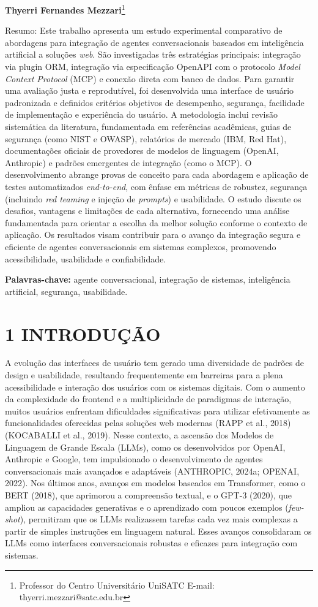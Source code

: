 \documentclass[
]{article}
\begin{document}
\textbf{Thyerri Fernandes Mezzari}\footnote{Professor do Centro
  Universitário UniSATC E-mail: thyerri.mezzari@satc.edu.br}

Resumo: Este trabalho apresenta um estudo experimental comparativo de
abordagens para integração de agentes conversacionais baseados em
inteligência artificial a soluções \emph{web}. São investigadas três
estratégias principais: integração via plugin ORM, integração via
especificação OpenAPI com o protocolo \emph{Model Context Protocol}
(MCP) e conexão direta com banco de dados. Para garantir uma avaliação
justa e reprodutível, foi desenvolvida uma interface de usuário
padronizada e definidos critérios objetivos de desempenho, segurança,
facilidade de implementação e experiência do usuário. A metodologia
inclui revisão sistemática da literatura, fundamentada em referências
acadêmicas, guias de segurança (como NIST e OWASP), relatórios de
mercado (IBM, Red Hat), documentações oficiais de provedores de modelos
de linguagem (OpenAI, Anthropic) e padrões emergentes de integração
(como o MCP). O desenvolvimento abrange provas de conceito para cada
abordagem e aplicação de testes automatizados \emph{end-to-end}, com
ênfase em métricas de robustez, segurança (incluindo \emph{red teaming}
e injeção de \emph{prompts}) e usabilidade. O estudo discute os
desafios, vantagens e limitações de cada alternativa, fornecendo uma
análise fundamentada para orientar a escolha da melhor solução conforme
o contexto de aplicação. Os resultados visam contribuir para o avanço da
integração segura e eficiente de agentes conversacionais em sistemas
complexos, promovendo acessibilidade, usabilidade e confiabilidade.

\textbf{Palavras-chave:} agente conversacional, integração de sistemas,
inteligência artificial, segurança, usabilidade.

\section{1 INTRODUÇÃO}\label{introduuxe7uxe3o}

A evolução das interfaces de usuário tem gerado uma diversidade de
padrões de design e usabilidade, resultando frequentemente em barreiras
para a plena acessibilidade e interação dos usuários com os sistemas
digitais. Com o aumento da complexidade do frontend e a multiplicidade
de paradigmas de interação, muitos usuários enfrentam dificuldades
significativas para utilizar efetivamente as funcionalidades oferecidas
pelas soluções web modernas (RAPP et al., 2018) (KOCABALLI et al.,
2019). Nesse contexto, a ascensão dos Modelos de Linguagem de Grande
Escala (LLMs), como os desenvolvidos por OpenAI, Anthropic e Google, tem
impulsionado o desenvolvimento de agentes conversacionais mais avançados
e adaptáveis (ANTHROPIC, 2024a; OPENAI, 2022). Nos últimos anos, avanços
em modelos baseados em Transformer, como o BERT (2018), que aprimorou a
compreensão textual, e o GPT-3 (2020), que ampliou as capacidades
generativas e o aprendizado com poucos exemplos (\emph{few-shot}),
permitiram que os LLMs realizassem tarefas cada vez mais complexas a
partir de simples instruções em linguagem natural. Esses avanços
consolidaram os LLMs como interfaces conversacionais robustas e eficazes
para integração com sistemas.
\end{document}
